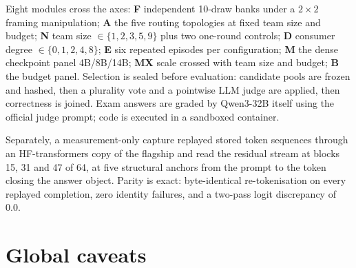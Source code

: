 \documentclass[10pt,a4paper]{article}
\begin{document}
Eight modules cross the axes: \textbf{F} independent 10-draw banks under a $2\times2$ framing manipulation; \textbf{A} the five routing topologies at fixed team size and budget; \textbf{N} team size $\in\{1,2,3,5,9\}$ plus two one-round controls; \textbf{D} consumer degree $\in\{0,1,2,4,8\}$; \textbf{E} six repeated episodes per configuration; \textbf{M} the dense checkpoint panel 4B/8B/14B; \textbf{MX} scale crossed with team size and budget; \textbf{B} the budget panel. Selection is sealed before evaluation: candidate pools are frozen and hashed, then a plurality vote and a pointwise LLM judge are applied, then correctness is joined. Exam answers are graded by Qwen3-32B itself using the official judge prompt; code is executed in a sandboxed container.

Separately, a measurement-only capture replayed stored token sequences through an HF-transformers copy of the flagship and read the residual stream at blocks 15, 31 and 47 of 64, at five structural anchors from the prompt to the token closing the answer object. Parity is exact: byte-identical re-tokenisation on every replayed completion, zero identity failures, and a two-pass logit discrepancy of 0.0.

\section{Global caveats}\label{sec:caveats}
\end{document}
